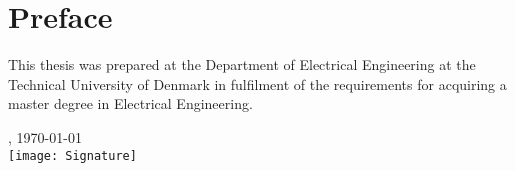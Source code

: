 \chapter{Preface}
This thesis was prepared at the Department of Electrical Engineering at the Technical University of Denmark in fulfilment of the requirements for acquiring a master degree in Electrical Engineering.


\vfill

{
\centering
    \thesislocation{}, \today\\[1cm]
    \hspace{3cm}\texttt{[image: Signature]}\\[1cm]
\begin{flushright}
    \thesisauthor{}
\end{flushright}
}